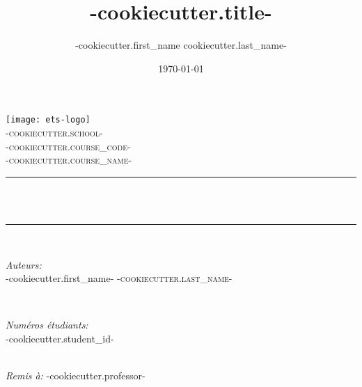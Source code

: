\documentclass[10pt]{etsmtl-report}
\title{ {{-cookiecutter.title-}} }
\author{ {{-cookiecutter.first_name}} {{cookiecutter.last_name-}} }
\date{\today}
\makeatletter
\def \coursename { {{-cookiecutter.course_name-}} }
\def \coursecode { {{-cookiecutter.course_code-}} }
\def \school { {{-cookiecutter.school-}} }
\def \studentid { {{-cookiecutter.student_id-}} }
\def \firstname { {{-cookiecutter.first_name-}} }
\def \lastname { {{-cookiecutter.last_name-}} }
\def \professor { {{-cookiecutter.professor-}} }
\let\thetitle\@title
\let\thedate\@date
\makeatother
\begin{document}
\begin{titlepage}
  \centering
  \vspace*{0.5 cm}
  \texttt{[image: ets-logo]}\\[1.0 cm]
  \textsc{ \LARGE \school}\\[2.0 cm]
  \textsc{\Large \coursecode}\\[0.5 cm]
  \textsc{\large \coursename}\\[0.5 cm]
  \rule{\linewidth}{0.2 mm} \\[0.4 cm]
  { \huge \bfseries \thetitle}\\
  \rule{\linewidth}{0.2 mm} \\[1.5 cm]

  \begin{minipage}{0.4\textwidth}
    \begin{flushleft}
      \emph{Auteurs:}\\
      \firstname \thinspace \textsc{\lastname}\\
      \end{flushleft}
      \end{minipage}~
      \begin{minipage}{0.4\textwidth}
      \begin{flushright}
      \emph{Numéros étudiants:} \\
      \studentid	\\
    \end{flushright}
  \end{minipage}\\[2 cm]

  \emph{Remis à:} \professor\\
  {\thedate}\\[2 cm]
\end{titlepage}

\cleardoublepage

\tableofcontents


\end{document}
